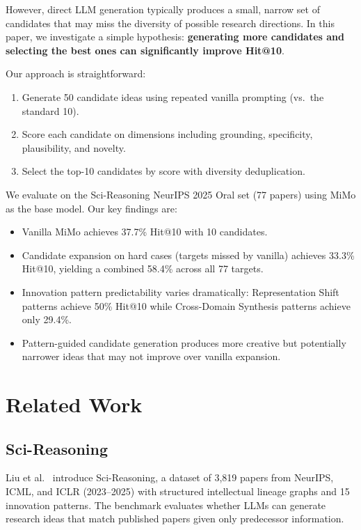 \documentclass[conference]{IEEEtran}
\begin{document}
However, direct LLM generation typically produces a small, narrow set of candidates that may miss the diversity of possible research directions. In this paper, we investigate a simple hypothesis: \textbf{generating more candidates and selecting the best ones can significantly improve Hit@10}.

Our approach is straightforward:
\begin{enumerate}
    \item Generate 50 candidate ideas using repeated vanilla prompting (vs.\ the standard 10).
    \item Score each candidate on dimensions including grounding, specificity, plausibility, and novelty.
    \item Select the top-10 candidates by score with diversity deduplication.
\end{enumerate}

We evaluate on the Sci-Reasoning NeurIPS 2025 Oral set (77 papers) using MiMo as the base model. Our key findings are:

\begin{itemize}
    \item Vanilla MiMo achieves 37.7\% Hit@10 with 10 candidates.
    \item Candidate expansion on hard cases (targets missed by vanilla) achieves 33.3\% Hit@10, yielding a combined 58.4\% across all 77 targets.
    \item Innovation pattern predictability varies dramatically: Representation Shift patterns achieve 50\% Hit@10 while Cross-Domain Synthesis patterns achieve only 29.4\%.
    \item Pattern-guided candidate generation produces more creative but potentially narrower ideas that may not improve over vanilla expansion.
\end{itemize}

\section{Related Work}

\subsection{Sci-Reasoning}

Liu et al.\ \cite{liu2025scireasoning} introduce Sci-Reasoning, a dataset of 3,819 papers from NeurIPS, ICML, and ICLR (2023--2025) with structured intellectual lineage graphs and 15 innovation patterns. The benchmark evaluates whether LLMs can generate research ideas that match published papers given only predecessor information.
\end{document}
